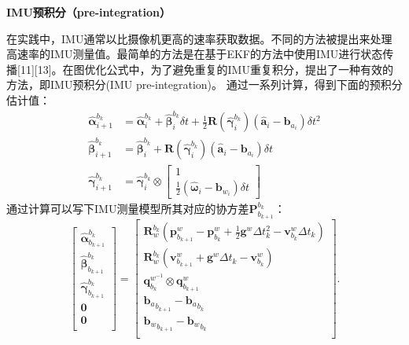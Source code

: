 \documentclass[cs4size,a4paper]{ctexart}
\numberwithin{equation}{section}
\numberwithin{table}{section}
\numberwithin{figure}{section}
\begin{document}
\textbf{IMU预积分（pre-integration）}

在实践中，IMU通常以比摄像机更高的速率获取数据。不同的方法被提出来处理高速率的IMU测量值。最简单的方法是在基于EKF的方法中使用IMU进行状态传播[11][13]。在图优化公式中，为了避免重复的IMU重复积分，提出了一种有效的方法，即IMU预积分(IMU pre-integration)。
通过一系列计算，得到下面的预积分估计值：
\begin{align} 
\hat{\boldsymbol{\alpha }}^{b_k}_{i+1} &= \hat{\boldsymbol{\alpha }}^{b_k}_i + \hat{\boldsymbol{\beta }}^{b_k}_i\delta t + \frac{1}{2} \mathbf {R}(\hat{\boldsymbol{\gamma }}^{b_k}_i)(\hat{\mathbf {a}}_i - \mathbf {b}_{a_i}) \delta t^2 \nonumber\\ \hat{\boldsymbol{\beta }}^{b_k}_{i+1} &= \hat{\boldsymbol{\beta }}^{b_k}_{i} + \mathbf {R}(\hat{\boldsymbol{\gamma }}^{b_k}_i)(\hat{\mathbf {a}}_i - \mathbf {b}_{a_i})\delta t\nonumber\\ \hat{\boldsymbol{\gamma }}^{b_k}_{i+1} &= \hat{\boldsymbol{\gamma }}^{b_k}_i \otimes {\left[\begin{array}{c}1\\ \frac{1}{2} (\hat{\boldsymbol{\omega }}_i- \mathbf {b}_{w_i})\delta t \end{array}\right]}
\end{align}
通过计算可以写下IMU测量模型所其对应的协方差${\mathbf {P}^{b_k}_{b_{k+1}}}$：
\begin{equation} 
{\left[\begin{array}{c}\hat{\boldsymbol{\alpha }}^{b_k}_{b_{k+1}}\\ \hat{\boldsymbol{\beta }}^{b_k}_{b_{k+1}}\\ \hat{\boldsymbol{\gamma }}^{b_k}_{b_{k+1}}\\ \mathbf {0}\\ \mathbf {0}\\ \end{array}\right]} = {\left[\begin{array}{c}\mathbf {R}^{b_k}_{w}(\mathbf {p}^{w}_{b_{k+1}} - \mathbf {p}^{w}_{b_k} + \frac{1}{2}\mathbf {g}^{w} \Delta t_k^2 - \mathbf {v}^{w}_{b_k} \Delta t_k) \\ \mathbf {R}^{b_k}_{w}(\mathbf {v}^{w}_{b_{k+1}} + \mathbf {g}^{w} \Delta t_k- \mathbf {v}^{w}_{b_k}) \\ \mathbf {q}^{w^{-1}}_{b_{k}} \otimes \mathbf {q}^{w}_{b_{k+1}}\\ {\mathbf {b}_a}_{b_{k+1}} - {\mathbf {b}_a}_{b_k}\\ {\mathbf {b}_w}_{b_{k+1}} -{\mathbf {b}_w}_{b_k}\\ \end{array}\right]}.
\end{equation}
\end{document}
